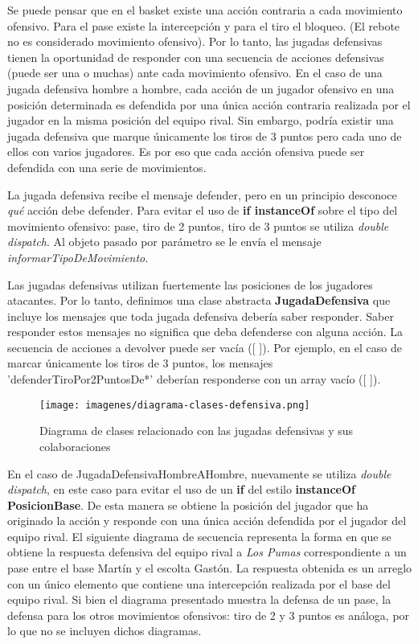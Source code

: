 Se puede pensar que en el basket existe una acción contraria a cada movimiento ofensivo. Para el pase existe la intercepción y para el tiro el bloqueo. (El rebote no es considerado
movimiento ofensivo). Por lo tanto, las jugadas defensivas tienen la oportunidad de responder con una secuencia de acciones defensivas (puede ser una o muchas) ante cada movimiento
ofensivo. En el caso de una jugada defensiva hombre a hombre, cada acción de un jugador ofensivo en una posición determinada es defendida por una única acción 
contraria realizada por el jugador en la misma posición del equipo rival. Sin embargo, podría existir una jugada defensiva que marque únicamente los tiros de 3 puntos pero cada uno de ellos
con varios jugadores. Es por eso que cada acción ofensiva puede ser defendida con una serie de movimientos.

La jugada defensiva recibe el mensaje defender, pero en un principio desconoce \emph{qué} acción debe defender. Para evitar el uso de \textbf{if instanceOf} 
sobre el tipo del movimiento ofensivo: pase, tiro de 2 puntos, tiro de 3 puntos se utiliza \emph{double dispatch}.
Al objeto pasado por parámetro se le envía el mensaje \emph{informarTipoDeMovimiento}. 

Las jugadas defensivas utilizan fuertemente las posiciones de los jugadores atacantes. Por lo tanto, definimos una clase abstracta \textbf{JugadaDefensiva} que incluye los mensajes
que toda jugada defensiva debería saber responder. Saber responder estos mensajes no significa que deba defenderse con alguna acción. La secuencia de acciones a devolver puede ser 
vacía ([ ]). Por ejemplo, en el caso de marcar únicamente los tiros de 3 puntos, los mensajes 'defenderTiroPor2PuntosDe*' 
deberían responderse con un array vacío ([ ]).

\begin{figure}[h!]
  \texttt{[image: imagenes/diagrama-clases-defensiva.png]}
  \caption{Diagrama de clases relacionado con las jugadas defensivas y sus colaboraciones}
\end{figure}

En el caso de JugadaDefensivaHombreAHombre, nuevamente se utiliza \emph{double dispatch}, en este caso para evitar el uso de un \textbf{if} del estilo \textbf{instanceOf PosicionBase}.
De esta manera se obtiene la posición del jugador que ha originado la acción y responde con una única acción defendida por el jugador del equipo rival.
El siguiente diagrama de secuencia representa la forma en que se obtiene la respuesta defensiva del equipo rival a \emph{Los Pumas} correspondiente a un pase entre 
el base Martín y el escolta Gastón. La respuesta obtenida es un arreglo con un único elemento que contiene una intercepción realizada por el base del equipo rival.
Si bien el diagrama presentado muestra la defensa de un pase, la defensa para los otros movimientos ofensivos: tiro de 2 y 3 puntos es análoga, por lo que no se 
incluyen dichos diagramas.

